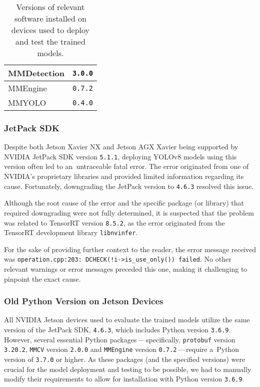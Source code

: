 \begin{table}[t]
\begin{threeparttable}
\begin{tabular}{|l|c|c|c|c|}
            \hline
            MMDetection      & \multicolumn{4}{c|}{\texttt{3.0.0}} \\
            \hline
            MMEngine         & \multicolumn{4}{c|}{\texttt{0.7.2}} \\
            \hline
            MMYOLO           & \multicolumn{4}{c|}{\texttt{0.4.0}} \\
            \hline
        \end{tabular}
        \caption{Versions of relevant software installed on devices used to deploy and test the trained models.}
        \label{DevicesPackages}
    \end{threeparttable}
\end{table}


\subsubsection*{JetPack SDK}

Despite both Jetson Xavier NX and Jetson AGX Xavier being supported by NVIDIA
JetPack SDK version \texttt{5.1.1}, deploying YOLOv8 models using this version
often led to an~untraceable fatal error. The error originated from one of
NVIDIA's proprietary libraries and provided limited information regarding its
cause. Fortunately, downgrading the JetPack version to \texttt{4.6.3} resolved
this issue.

Although the root cause of the error and the specific package (or library) that
required downgrading were not fully determined, it is suspected that the problem
was related to TensorRT version \texttt{8.5.2}, as the error originated from the
TensorRT development library \texttt{libnvinfer}.

For the sake of providing further context to the reader, the error message
received was \verb|operation.cpp:203: DCHECK(!i->is_use_only()) failed|. No
other relevant warnings or error messages preceded this one, making it
challenging to pinpoint the exact cause.


\subsubsection*{Old Python Version on Jetson Devices}

All NVIDIA Jetson devices used to evaluate the trained models utilize the same
version of the JetPack SDK, \texttt{4.6.3}, which includes Python version
\texttt{3.6.9}. However, several essential Python packages\,---\,specifically,
\texttt{protobuf} version \texttt{3.20.2}, \texttt{MMCV} version \texttt{2.0.0}
and \texttt{MMEngine} version \texttt{0.7.2}\,---\,require a~Python version of
\texttt{3.7.0} or higher. As these packages (and the specified versions) were
crucial for the model deployment and testing to be possible, we had to manually
modify their requirements to allow for installation with Python version
\texttt{3.6.9}.


